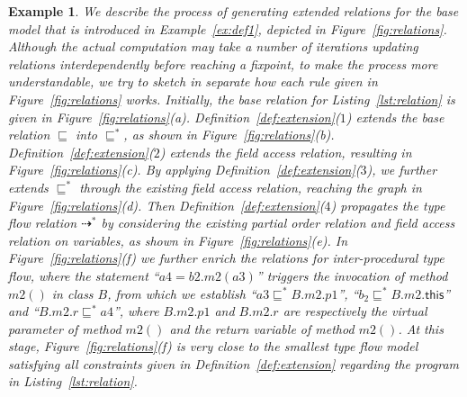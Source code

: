 \documentclass{fac}
\newtheorem{Example}{Example}
\newcommand{\keyword}[1]{\mathsf{#1}}
\newcommand{\less}{\sqsubseteq}
\newcommand{\tflow}{\dashrightarrow}
\begin{document}
\begin{Example}\label{ex:def2} %
We describe the process of generating extended relations for the base model that is introduced in Example~\ref{ex:def1}, depicted in Figure~\ref{fig:relations}. Although the actual computation may take a number of iterations updating relations interdependently before reaching a fixpoint, to make the process more understandable, we try to sketch in separate how each rule given in Figure~\ref{fig:relations} works. Initially, the base relation for Listing~\ref{lst:relation} is given in Figure~\ref{fig:relations}(a). Definition~\ref{def:extension}($1$) extends the base relation $\less$ into $\less^*$, as shown in Figure~\ref{fig:relations}(b). Definition~\ref{def:extension}($2$) extends the field access relation, resulting in Figure~\ref{fig:relations}(c). By applying Definition~\ref{def:extension}($3$), we further extends $\less^*$ through the existing field access relation, reaching the graph in Figure~\ref{fig:relations}(d). Then Definition~\ref{def:extension}($4$) propagates the type flow relation $\tflow^*$ by considering the existing partial order relation and field access relation on variables, as shown in Figure~\ref{fig:relations}(e). In Figure~\ref{fig:relations}(f) we further enrich the relations for inter-procedural type flow, where the statement ``$a4=b2.m2(a3)$'' triggers the invocation of method $m2()$ in class $B$, from which we establish ``$a3 \less^* B.m2.p1$'', ``$b_2\less^* B.m2.\keyword{this}$'' and ``$B.m2.r \less^* a4$'', where $B.m2.p1$ and $B.m2.r$ are respectively the virtual parameter of method $m2()$ and the return variable of method $m2()$. At this stage, Figure~\ref{fig:relations}(f) is very close to the smallest type flow model satisfying all constraints given in Definition~\ref{def:extension} regarding the program in Listing~\ref{lst:relation}.
%
\end{Example}
\end{document}
